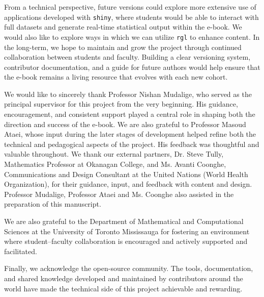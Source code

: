 \documentclass[11pt]{article}
\begin{document}
From a technical perspective, future versions could explore more extensive use of 
applications developed with \texttt{shiny}, where students would be able to interact with full datasets and generate real-time statistical output within the e-book. 
We would also like to explore ways in which we can utilize \texttt{rgl} to enhance content.
In the long-term, we hope to maintain and grow the project through continued collaboration between students and faculty. Building a clear versioning system, contributor documentation, and a guide for future authors would help ensure that the e-book remains a living resource that evolves with each new cohort.


\begin{acknowledgments}
We would like to sincerely thank Professor Nishan Mudalige, who served as the principal supervisor for this project from the very beginning. His guidance, encouragement, and consistent support played a central role in shaping both the direction and success of the e-book.
We are also grateful to Professor Masoud Ataei, whose input during the later stages of development helped refine both the technical and pedagogical aspects of the project. His feedback was thoughtful and valuable throughout.
We thank our external partners, Dr. Steve Tully, Mathematics Professor at Okanagan College, and Ms. Avanti Coonghe, Communications and Design Consultant at the United Nations (World Health Organization), for their guidance, input, and feedback with content and design.
Professor Mudalige, Professor Ataei and Ms. Coonghe also assisted in the preparation of this manuscript.

We are also grateful to the Department of Mathematical and Computational Sciences at the University of Toronto Mississauga for fostering an environment where student–faculty collaboration is encouraged and actively supported and facilitated.

Finally, we acknowledge the open-source community. The tools, documentation, and shared knowledge developed and maintained by contributors around the world have made the technical side of this project achievable and rewarding.
\end{acknowledgments}

\printbibliography[title={REFERENCES},heading=bibintoc]
\end{document}

